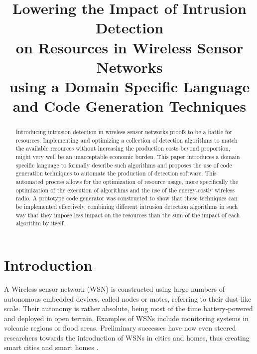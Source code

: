 \documentclass[conference]{IEEEtran}
\begin{document}
\expandafter\def\csname PY@tok@err\endcsname{}

\title{Lowering the Impact of Intrusion Detection\\
on Resources in Wireless Sensor Networks\\
using a Domain Specific Language\\
and Code Generation Techniques}

\author{%
}

\maketitle

\begin{abstract}
  
Introducing intrusion detection in wireless sensor networks proofs to be a
battle for resources. Implementing and optimizing a collection of detection
algorithms to match the available resources without increasing the production
costs beyond proportion, might very well be an unacceptable economic burden.
This paper introduces a domain specific language to formally describe such
algorithms and proposes the use of code generation techniques to automate the
production of detection software. This automated process allows for the
optimization of resource usage, more specifically the optimization of the
execution of algorithms and the use of the energy-costly wireless radio. A
prototype code generator was constructed to show that these techniques can be
implemented effectively, combining different intrusion detection algorithms in
such way that they impose less impact on the resources than the sum of the
impact of each algorithm by itself.

\end{abstract}

\section{Introduction}

A Wireless sensor network (WSN) is constructed using large numbers of
autonomous embedded devices, called nodes or motes, referring to their
dust-like scale. Their autonomy is rather absolute, being most of the time
battery-powered and deployed in open terrain. Examples of WSNs include
monitoring systems in volcanic regions or flood areas. Preliminary successes
have now even steered researchers towards the introduction of WSNs in cities
and homes, thus creating smart cities \cite{schaffers2011smart} and smart homes
\cite{chan2008review}.
\end{document}
